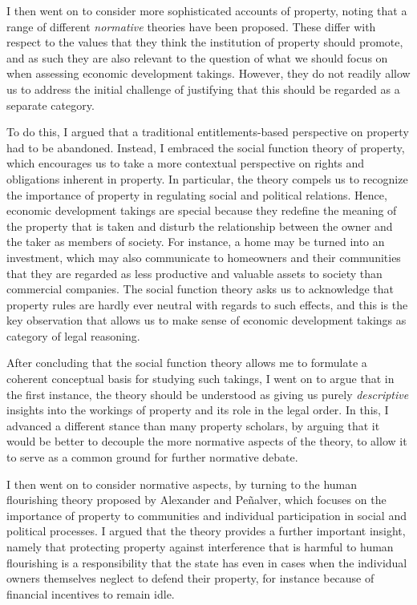 I then went on to consider more sophisticated accounts of property, noting that a range of different {\it normative} theories have been proposed. These differ with respect to the values that they think the institution of property should promote, and as such they are also relevant to the question of what we should focus on when assessing economic development takings. However, they do not readily allow us to address the initial challenge of justifying that this should be regarded as a separate category.

To do this, I argued that a traditional entitlements-based perspective on property had to be abandoned. Instead, I embraced the social function theory of property, which encourages us to take a more contextual perspective on rights and obligations inherent in property. In particular, the theory compels us to recognize the importance of property in regulating social and political relations. Hence, economic development takings are special because they redefine the meaning of the property that is taken and disturb the relationship between the owner and the taker as members of society. For instance, a home may be turned into an investment, which may also communicate to homeowners and their communities that they are regarded as less productive and valuable assets to society than commercial companies. The social function theory asks us to acknowledge that property rules are hardly ever neutral with regards to such effects, and this is the key observation that allows us to make sense of economic development takings as category of legal reasoning. 

After concluding that the social function theory allows me to formulate a coherent conceptual basis for studying such takings, I went on to argue that in the first instance, the theory should be understood as giving us purely {\it descriptive} insights into the workings of property and its role in the legal order. In this, I advanced a different stance than many property scholars, by arguing that it would be better to decouple the more normative aspects of the theory, to allow it to serve as a common ground for further normative debate. 

I then went on to consider normative aspects, by turning to the human flourishing theory proposed by Alexander and Pe\~{n}alver, which focuses on the importance of property to communities and individual participation in social and political processes. I argued that the theory provides a further important insight, namely that protecting property against interference that is harmful to human flourishing is a responsibility that the state has even in cases when the individual owners themselves neglect to defend their property, for instance because of financial incentives to remain idle.


